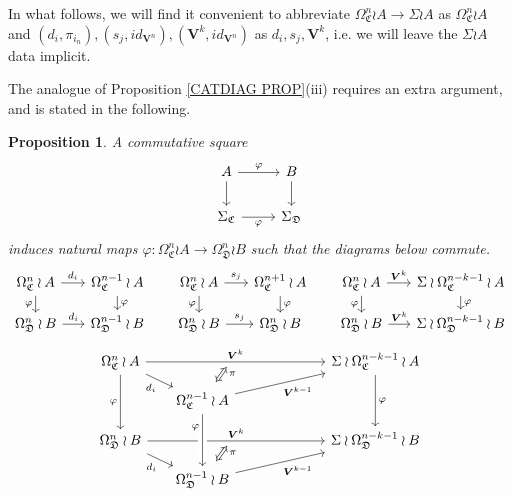 \documentclass[a4paper,10pt
]{article}%
\numberwithin{equation}{section}
\numberwithin{figure}{section}
\newtheorem{proposition}[equation]{Proposition}%
\theoremstyle{definition} %
\newcommand{\1}{\ensuremath{\mathbbm 1}}%
\begin{document}
In what follows, we will find it convenient to abbreviate
$\Omega_{\mathfrak{C}}^n \wr A \to \Sigma \wr A$
as 
$\Omega_{\mathfrak{C}}^n \wr A$
and
$(d_i,\pi_{i_n}), (s_j,id_{\boldsymbol{V}^n}),
(\boldsymbol{V}^k,id_{\boldsymbol{V}^n})
$
as 
$d_i,s_j,\boldsymbol{V}^k$, 
i.e. we will leave the $\Sigma \wr A$
data implicit.

The analogue of Proposition \ref{CATDIAG PROP}(iii) requires an extra argument, and is stated in the following.


\begin{proposition}\label{SPANPIECE PROP}
	A commutative square
	\begin{equation}\label{SPANPIECE EQ}
	\begin{tikzcd}
	A \ar{d} \ar{r}{\varphi} &  \ar{d} B
	\\
	\Sigma_{\mathfrak{C}} \ar{r}[swap]{\varphi} & \Sigma_{\mathfrak{D}}
	\end{tikzcd}
	\end{equation}
	induces natural maps 
	$\varphi \colon
	\Omega_{\mathfrak{C}}^n \wr A \to 
	\Omega_{\mathfrak{D}}^n \wr B $
	such that the diagrams below commute.
	\[
	\begin{tikzcd}[column sep = 16pt, row sep = 10pt]
	\Omega^n_{\mathfrak{C}} \wr A \ar{r}{d_i} \ar{d}[swap]{\varphi} &
	\Omega^{n-1}_{\mathfrak{C}} \wr A \ar{d}{\varphi}
	&
	\Omega^n_{\mathfrak{C}} \wr A \ar{r}{s_j} \ar{d}[swap]{\varphi} &
	\Omega^{n+1}_{\mathfrak{C}}\wr A \ar{d}{\varphi}
	&
	\Omega^n_{\mathfrak{C}} \wr A \ar{r}{\boldsymbol{V}^k} \ar{d}[swap]{\varphi} &
	\Sigma \wr \Omega^{n-k-1}_{\mathfrak{C}} \wr A \ar{d}{\varphi}
	\\
	\Omega^n_{\mathfrak{D}} \wr B \ar{r}{d_i} &
	\Omega^{n-1}_{\mathfrak{D}} \wr B
	&
	\Omega^n_{\mathfrak{D}} \wr B \ar{r}{s_j} &
	\Omega^n_{\mathfrak{D}} \wr B
	&
	\Omega^n_{\mathfrak{D}} \wr B \ar{r}{\boldsymbol{V}^k} &
	\Sigma \wr \Omega^{n-k-1}_{\mathfrak{D}} \wr B
	\end{tikzcd}
	\]
	\[
	\begin{tikzcd}[column sep = 16pt, row sep = small]
	\Omega^n_{\mathfrak{C}} \wr A
	\ar{rrrrr}[name=toE]{\boldsymbol{V}^k} \ar{rd}[swap]{d_i} \ar{dd}[swap]{\varphi}
	&&&
	&&
	\Sigma \wr \Omega^{n-k-1}_{\mathfrak{C}} \wr A  \ar{dd}{\varphi}
	\\
	&
	|[alias=DBE]|
	\Omega^{n-1}_{\mathfrak{C}} \wr A \ar{rrrru}[swap]{\boldsymbol{V}^{k-1}}
	\\
	\Omega^n_{\mathfrak{D}} \wr B \ar{rrrrr}[name=toB]{\boldsymbol{V}^k} \ar{rd}[swap]{d_i}
	&&&
	&&
	\Sigma \wr \Omega^{n-k-1}_{\mathfrak{D}} \wr B
	\\
	&
	|[alias=D]| \Omega^{n-1}_{\mathfrak{D}} \wr B \ar{rrrru}[swap]{\boldsymbol{V}^{k-1}}
	\arrow[Leftrightarrow, from=DBE, to=toE, shorten <=0.15cm,shorten >=0.15cm
	,swap,near end,"\pi"
	]
	\arrow[Leftrightarrow, from=D, to=toB, shorten <=0.15cm,shorten >=0.15cm,swap,near end,"\pi"]
	\arrow[from=DBE, to=D, crossing over, near start, swap, "\varphi"]
	\end{tikzcd}
	\]
\end{proposition}
\end{document}
